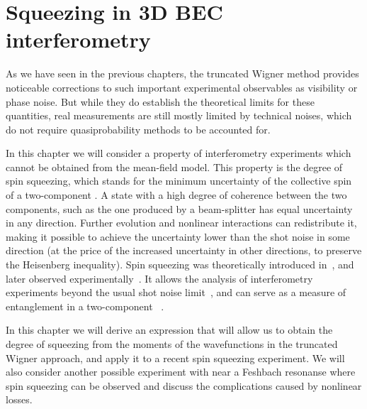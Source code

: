 \chapter{Squeezing in 3D BEC interferometry}
\label{cha:bec-squeezing}

As we have seen in the previous chapters, the truncated Wigner method provides noticeable corrections to such important experimental observables as visibility or phase noise.
But while they do establish the theoretical limits for these quantities, real measurements are still mostly limited by technical noises, which do not require quasiprobability methods to be accounted for.

In this chapter we will consider a property of  interferometry experiments which cannot be obtained from the mean-field model.
This property is the degree of spin squeezing, which stands for the minimum uncertainty of the collective spin of a two-component .
A state with a high degree of coherence between the two components, such as the one produced by a beam-splitter has equal uncertainty in any direction.
Further evolution and nonlinear interactions can redistribute it, making it possible to achieve the uncertainty lower than the shot noise in some direction (at the price of the increased uncertainty in other directions, to preserve the Heisenberg inequality).
Spin squeezing was theoretically introduced in~\cite{Kitagawa1993,Wineland1994}, and later observed experimentally~\cite{Hald1999,Kuzmich2000}.
It allows the analysis of interferometry experiments beyond the usual shot noise limit~\cite{Riedel2010,Gross2010}, and can serve as a measure of entanglement in a two-component ~\cite{Sorensen2001}.

In this chapter we will derive an expression that will allow us to obtain the degree of squeezing from the moments of the wavefunctions in the truncated Wigner approach, and apply it to a recent spin squeezing experiment.
We will also consider another possible experiment with  near a Feshbach resonanse where spin squeezing can be observed and discuss the complications caused by nonlinear losses.






